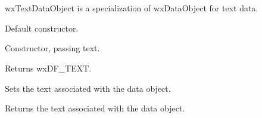 \section{}\label{wxtextdataobject}

 wxTextDataObject is a specialization of wxDataObject for text data.






\label{wxtextdataobjectwxtextdataobject}


Default constructor.


Constructor, passing text.

\label{wxtextdataobjectgetformat}


Returns wxDF\_TEXT.

\label{wxtextdataobjectsettext}


Sets the text associated with the data object.

\label{wxtextdataobjectgettext}


Returns the text associated with the data object.

